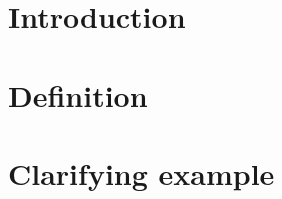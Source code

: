\documentclass[twoside]{project}
\date{\today}
\begin{document}
\maketitle

\section*{Introduction}

\section*{Definition}


\section*{Clarifying example}


\section*{}


\section*{}


{}

\end{document}
